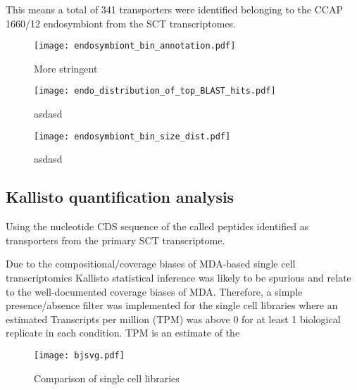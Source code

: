 This means a total of 341 transporters were identified 
belonging to the CCAP 1660/12 endosymbiont from the SCT transcriptomes. 







\begin{figure}
    \texttt{[image: endosymbiont\_bin\_annotation.pdf]}
    \caption{More stringent} 
\end{figure}



\begin{figure}
    \texttt{[image: endo\_distribution\_of\_top\_BLAST\_hits.pdf]}
    \caption[Endostymbiont Bin Top BLAST Hits]{asdasd}
\end{figure}


\begin{figure}
    \texttt{[image: endosymbiont\_bin\_size\_dist.pdf]}
    \caption{asdasd}
\end{figure}



\subsection{Kallisto quantification analysis}

Using the nucleotide CDS sequence of the called peptides identified as transporters
from the primary SCT transcriptome. 

Due to the compositional/coverage biases of MDA-based single cell transcriptomics 
Kallisto statistical inference was likely to be spurious and relate to the 
well-documented coverage biases of MDA. Therefore, a simple presence/absence
filter was implemented for the single cell libraries where an estimated
Transcripts per million (TPM) was above 0 for at least 1 biological replicate
in each condition. 
TPM is an estimate of the 

\begin{figure}
	\texttt{[image: bjsvg.pdf]}
    \caption[Jasper-Shannon Divergence of Single Cell Libararies]{Comparison of single cell libraries}
\label{fig:jsd}
\end{figure}




